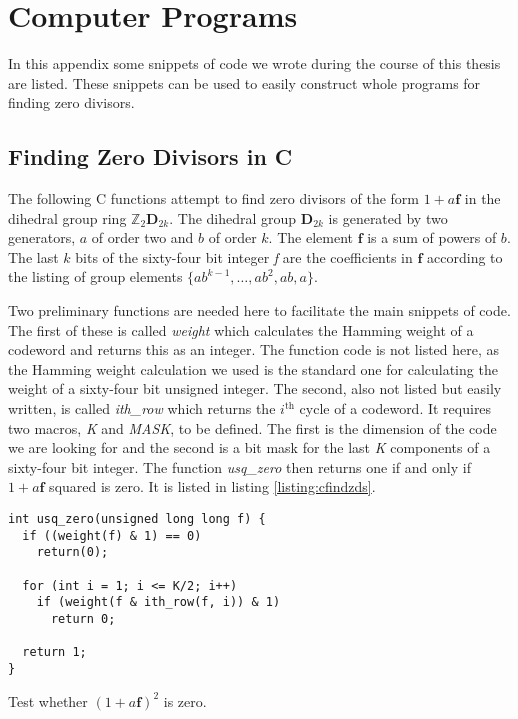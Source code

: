 \chapter{Computer Programs}
\label{appen:programs}
In this appendix some snippets of code we wrote during the course of this thesis are listed.
These snippets can be used to easily construct whole programs for finding zero divisors.

\section*{Finding Zero Divisors in C}
The following C functions attempt to find zero divisors of the form $1+a \mathbf{f}$ in the dihedral group ring $\mathbb{Z}_2 \mathbf{D}_{2k}$.
The dihedral group $\mathbf{D}_{2k}$ is generated by two generators, $a$ of order two and $b$ of order $k$.
The element $\mathbf{f}$ is a sum of powers of $b$.
The last $k$ bits of the sixty-four bit integer \emph{f} are the coefficients in $\mathbf{f}$ according to the listing of group elements $\{ ab^{k-1}, \ldots ,ab^2,ab,a \} $.

Two preliminary functions are needed here to facilitate the main snippets of code.
The first of these is called \emph{weight} which calculates the Hamming weight of a codeword and returns this as an integer.
The function code is not listed here, as the Hamming weight calculation we used is the standard one for calculating the weight of a sixty-four bit unsigned integer.
The second, also not listed but easily written, is called \emph{ith\_row} which returns the $i^{\textrm{th}}$ cycle of a codeword.
It requires two macros, \emph{K} and \emph{MASK}, to be defined.
The first is the dimension of the code we are looking for and the second is a bit mask for the last \emph{K} components of a sixty-four bit integer.
The function \emph{usq\_zero} then returns one if and only if $1 + a \mathbf{f}$ squared is zero.
It is listed in listing \ref{listing:cfindzds}.

\begin{listing}[ht]
\begin{verbatim}
int usq_zero(unsigned long long f) {
  if ((weight(f) & 1) == 0)
  	return(0);

  for (int i = 1; i <= K/2; i++) 
    if (weight(f & ith_row(f, i)) & 1)
	  return 0;

  return 1;
}
\end{verbatim}
\caption{Test whether $(1 + a \mathbf{f})^2$ is zero.}
\label{listing:cfindzds}
\end{listing}



